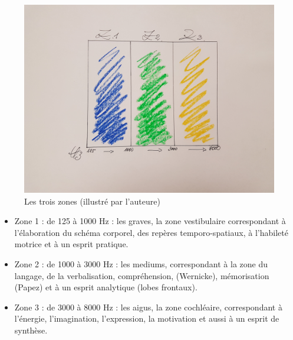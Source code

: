 \begin{figure}[ht]
	\centering
	\includegraphics[width=0.5\linewidth]{images/les3zones.jpg}
	\caption[Les 3 zones]{Les trois zones (illustré par l'auteure)}
	\label{Les trois zones du test d'écoute}
\end{figure}


\begin{itemize}
	\item Zone 1 : de 125 à 1000 Hz : les graves, la zone vestibulaire correspondant à l'élaboration
	du schéma corporel, des repères temporo-spatiaux, à l'habileté motrice et à un 
	esprit pratique.
	\item Zone 2 : de 1000 à 3000 Hz : les mediums, correspondant à  la zone du langage, de la
	verbalisation, compréhension, (Wernicke),
	mémorisation (Papez) et à un esprit analytique (lobes frontaux).
	\item Zone 3 : de 3000 à 8000 Hz : les aigus, la zone cochléaire, correspondant à l'énergie,
	 l'imagination, l'expression, la motivation et aussi à un esprit de synthèse.
	
\end{itemize}
 

